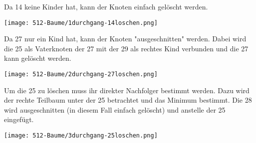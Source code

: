 Da 14 keine Kinder hat, kann der Knoten einfach gelöscht werden.

\begin{center}
\texttt{[image: 512-Baume/1durchgang-14loschen.png]}
\end{center}

Da 27 nur ein Kind hat, kann der Knoten "ausgeschnitten" werden. Dabei wird die 25 als Vaterknoten der 27 mit der 29 als rechtes Kind verbunden und die 27 kann gelöscht werden.

\begin{center}
\texttt{[image: 512-Baume/2durchgang-27loschen.png]}
\end{center}

Um die 25 zu löschen muss ihr direkter Nachfolger bestimmt werden. Dazu wird der rechte Teilbaum unter der 25 betrachtet und das Minimum bestimmt. Die 28 wird ausgeschnitten (in diesem Fall einfach gelöscht) und anstelle der 25 eingefügt.

\begin{center}
\texttt{[image: 512-Baume/3durchgang-25loschen.png]}
\end{center}